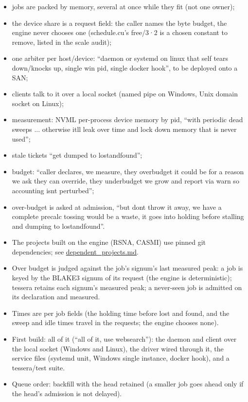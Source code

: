 \begin{itemize}
\item jobs are packed by memory, several at once while they fit (not one owner);
\item the device share is a request field: the caller names the byte budget, the engine never chooses one (schedule.cu's free/3·2 is a chosen constant to remove, listed in the scale audit);
\item one arbiter per host/device: “daemon or systemd on linux that self tears down/knocks up, single win pid, single docker hook”, to be deployed onto a SAN;
\item clients talk to it over a local socket (named pipe on Windows, Unix domain socket on Linux);
\item measurement: NVML per-process device memory by pid, “with periodic dead sweeps ... otherwise itll leak over time and lock down memory that is never used”;
\item stale tickets “get dumped to lostandfound”;
\item budget: “caller declares, we measure, they overbudget it could be for a reason we ask they can override, they underbudget we grow and report via warn so accounting isnt perturbed”;
\item over-budget is asked at admission, “but dont throw it away, we have a complete precalc tossing would be a waste, it goes into holding before stalling and dumping to lostandfound”.
\item The projects built on the engine (RSNA, CASMI) use pinned git dependencies; see \hyperref[chap:dependent-projects]{dependent\_\allowbreak{}projects.md}.
\item Over budget is judged against the job's signum's last measured peak: a job is keyed by the BLAKE3 signum of its request (the engine is deterministic); tessera retains each signum's measured peak; a never-seen job is admitted on its declaration and measured.
\item Times are per job fields (the holding time before lost and found, and the sweep and idle times travel in the requests; the engine chooses none).
\item First build: all of it (“all of it, use websearch”): the daemon and client over the local socket (Windows and Linux), the driver wired through it, the service files (systemd unit, Windows single instance, docker hook), and a tessera/test suite.
\item Queue order: backfill with the head retained (a smaller job goes ahead only if the head's admission is not delayed).

\end{itemize}
